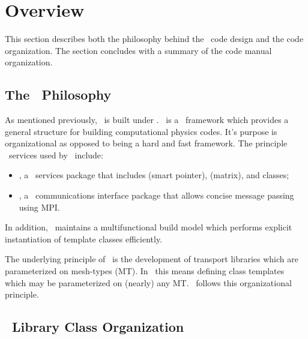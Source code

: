 
\section{Overview}

This section describes both the philosophy behind the \imctest\ code
design and the code organization.  The section concludes with a
summary of the code manual organization.

\subsection{The \draco\ Philosophy}

As mentioned previously, \imctest\ is built under \draco.  \draco\ is a
\cpp\ framework which provides a general structure for building
computational physics codes.  It's purpose is organizational as
opposed to being a hard and fast framework.  The principle \draco\ services
used by \imctest\ include:
\begin{itemize}
\item \dspp, a \cpp\ services package that includes  (smart
  pointer),  (matrix), and  classes;
\item \cccc, a \cpp\ communications interface package that allows
  concise message passing using MPI.
\end{itemize}
In addition, \draco\ maintains a multifunctional build model which
performs explicit instantiation of template classes efficiently.

The underlying principle of \draco\ is the development of transport
libraries which are parameterized on mesh-types (MT).  In \cpp\ this
means defining class templates which may be parameterized on (nearly)
any MT.  \imctest\ follows this organizational principle. 

\subsection{\imctest\ Library Class Organization}

